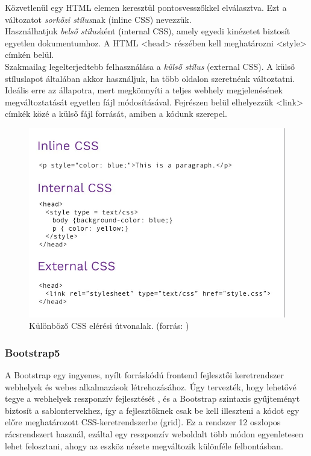 	Közvetlenül egy HTML elemen keresztül pontosvesszőkkel elválasztva. Ezt a változatot \emph{sorközi stílus}nak (inline CSS) nevezzük. \\

	Használhatjuk \emph{belső stílus}ként (internal CSS), amely egyedi kinézetet biztosít egyetlen dokumentumhoz. A HTML <head> részében kell meghatározni <style> címkén belül. \\

	Szakmailag legelterjedtebb felhasználása a \emph{külső stílus} (external CSS). A külső stíluslapot általában akkor használjuk, ha több oldalon szeretnénk változtatni. Ideális erre az állapotra, mert megkönnyíti a teljes webhely megjelenésének megváltoztatását egyetlen fájl módosításával. Fejrészen belül elhelyezzük <link> címkék közé a külső fájl forrását, amiben a kódunk szerepel.

\begin{figure}[h]
\centering
\includegraphics[scale=0.5]{images/cssTypes.png}
\caption{Különböző CSS elérési útvonalak. (forrás: \cite{cssTypes})}
\label{fig:css}
\end{figure}

\subsubsection{Bootstrap5}

A Bootstrap egy ingyenes, nyílt forráskódú frontend fejlesztői keretrendszer webhelyek és webes alkalmazások létrehozásához. Úgy tervezték, hogy lehetővé tegye a webhelyek reszponzív fejlesztését , és a Bootstrap szintaxis gyűjteményt biztosít a sablontervekhez, így a fejlesztőknek csak be kell illeszteni a kódot egy előre meghatározott CSS-keretrendszerbe (grid). Ez a rendszer 12 oszlopos rácsrendszert használ, ezáltal egy reszponzív weboldalt több módon egyenletesen lehet felosztani, ahogy az eszköz nézete megváltozik különféle felbontásban. \cite{Bootstrap}

